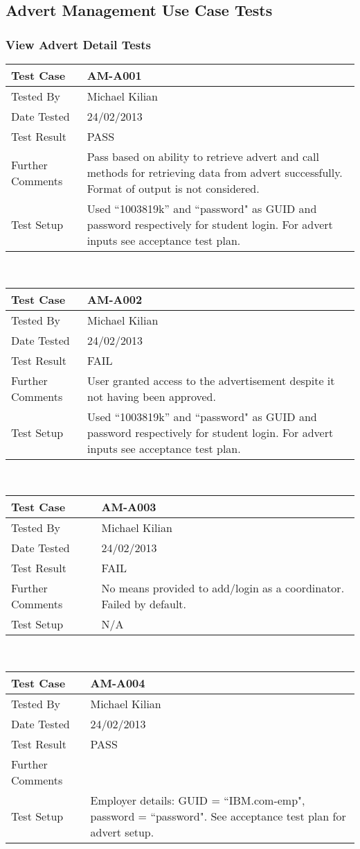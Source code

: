 \documentclass{l3deliverable}
\begin{document}
\newpage

\subsection{Advert Management Use Case Tests}

\subsubsection{View Advert Detail Tests}
\begin{tabular}{lp{10cm}}
\hline 
\textbf{Test Case} & AM-A001\tabularnewline
\hline 
\hline 
Tested By & Michael Kilian\tabularnewline
\hline 
Date Tested & 24/02/2013\tabularnewline
\hline 
Test Result & PASS\tabularnewline
\hline
Further Comments & Pass based on ability to retrieve advert and call methods for retrieving data from advert successfully. Format of output is not considered. \tabularnewline
\hline
Test Setup & Used ``1003819k'' and ``password" as GUID and password respectively for student login. For advert inputs see acceptance test plan. \tabularnewline
\hline
\end{tabular}\\

\begin{tabular}{lp{10cm}}
\hline 
\textbf{Test Case} & AM-A002\tabularnewline
\hline 
\hline 
Tested By & Michael Kilian\tabularnewline
\hline 
Date Tested & 24/02/2013\tabularnewline
\hline 
Test Result & FAIL\tabularnewline
\hline
Further Comments & User granted access to the advertisement despite it not having been approved.\tabularnewline
\hline
Test Setup & Used ``1003819k'' and ``password" as GUID and password respectively for student login. For advert inputs see acceptance test plan. \tabularnewline
\hline
\end{tabular}\\

\begin{tabular}{lp{10cm}}
\hline 
\textbf{Test Case} & AM-A003\tabularnewline
\hline 
\hline 
Tested By & Michael Kilian\tabularnewline
\hline 
Date Tested & 24/02/2013\tabularnewline
\hline 
Test Result & FAIL\tabularnewline
\hline
Further Comments & No means provided to add/login as a coordinator. Failed by default.\tabularnewline
\hline
Test Setup & N/A \tabularnewline
\hline
\end{tabular}\\

\begin{tabular}{lp{10cm}}
\hline 
\textbf{Test Case} & AM-A004\tabularnewline
\hline 
\hline 
Tested By & Michael Kilian\tabularnewline
\hline 
Date Tested & 24/02/2013\tabularnewline
\hline 
Test Result & PASS\tabularnewline
\hline
Further Comments & \tabularnewline
\hline
Test Setup & Employer details: GUID = ``IBM.com-emp", password = ``password". See acceptance test plan for advert setup.\tabularnewline
\hline
\end{tabular}\\
\end{document}
